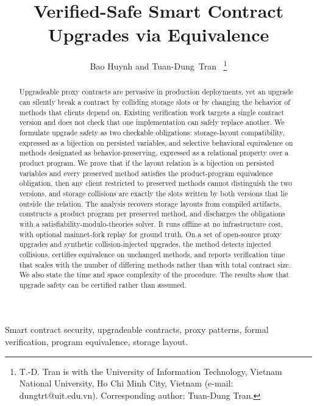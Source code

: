 \documentclass[journal]{IEEEtran}
\begin{document}
\title{Verified-Safe Smart Contract Upgrades via Equivalence}

\author{Bao Huynh and Tuan-Dung~Tran~\IEEEmembership{}
\thanks{T.-D. Tran is with the University of Information Technology, Vietnam National University, Ho Chi Minh City, Vietnam (e-mail: dungtrt@uit.edu.vn). Corresponding author: Tuan-Dung Tran.}}


\maketitle

\begin{abstract}
Upgradeable proxy contracts are pervasive in production deployments, yet an upgrade can silently break a contract by colliding storage slots or by changing the behavior of methods that clients depend on. Existing verification work targets a single contract version and does not check that one implementation can safely replace another. We formulate upgrade safety as two checkable obligations: storage-layout compatibility, expressed as a bijection on persisted variables, and selective behavioral equivalence on methods designated as behavior-preserving, expressed as a relational property over a product program. We prove that if the layout relation is a bijection on persisted variables and every preserved method satisfies the product-program equivalence obligation, then any client restricted to preserved methods cannot distinguish the two versions, and storage collisions are exactly the slots written by both versions that lie outside the relation. The analysis recovers storage layouts from compiled artifacts, constructs a product program per preserved method, and discharges the obligations with a satisfiability-modulo-theories solver. It runs offline at no infrastructure cost, with optional mainnet-fork replay for ground truth. On a set of open-source proxy upgrades and synthetic collision-injected upgrades, the method detects injected collisions, certifies equivalence on unchanged methods, and reports verification time that scales with the number of differing methods rather than with total contract size. We also state the time and space complexity of the procedure. The results show that upgrade safety can be certified rather than assumed.
\end{abstract}

\begin{IEEEkeywords}
Smart contract security, upgradeable contracts, proxy patterns, formal verification, program equivalence, storage layout.
\end{IEEEkeywords}
\end{document}
